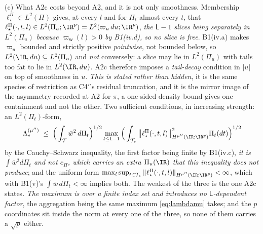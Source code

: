 \begin{remark}
\textup{(c)} What A2c costs beyond A2, and it is not only smoothness. Membership
$\ell^\Pi_\star\in L^{2}(\Pi)$ gives, at every $l$ and for $\Pi_t$-almost every $t$, that
$\ell^\Pi_\star(\cdot,t,l)\in L^{2}(\Pi_u;\IR^{p})=L^{2}(\varpi_u\,du;\IR^{p})$, \emph{the $\mathsf L-1$ slices
being separately in $L^{2}(\Pi_u)$ because $\varpi_{\mathsf w}(l)>0$ by B1(iv.d), so no slice is free}.
B1(iv.a) makes $\varpi_u$ bounded and
strictly positive \emph{pointwise}, not bounded below, so $L^{2}(\IR,du)\subseteq L^{2}(\Pi_u)$ and
\emph{not} conversely: a slice may lie in $L^{2}(\Pi_u)$ with tails too fat to lie in $L^{2}(\IR,du)$.
A2c therefore imposes a \emph{tail-decay} condition in $|u|$ on top of smoothness in $u$. \emph{This is
stated rather than hidden}, it is the same species of restriction as C4$'$'s residual truncation, and it
is the mirror image of the asymmetry recorded at A2 for $\pi$, a one-sided density bound gives one
containment and not the other. Two sufficient conditions, in increasing strength: an
$L^{2}(\Pi_t)$-form,
\[
\Lambda^{(\mu'')}_\star\;\le\;\Big(\int_{\mathcal T}\bar w^{2}\,d\Pi_t\Big)^{1/2}
\max_{l\le\mathsf L-1}
\Big(\int_{\mathcal T_\ast}\big\|\ell^\Pi_\star(\cdot,t,l)\big\|^{2}_{H^{\mu''}(\IR;\IR^{p})}\Pi_t(dt)\Big)^{1/2}
\]
by the Cauchy--Schwarz inequality, the first factor being finite by B1(iv.c), \emph{it is
$\int\bar w^{2}d\Pi_t$ and not $c_\Pi$, which carries an extra $\Pi_u(\IR)$ that this inequality does not
produce}; and the uniform form
$\max_{l}\sup_{t\in\mathcal T_\ast}\|\ell^\Pi_\star(\cdot,t,l)\|_{H^{\mu''}(\IR;\IR^{p})}<\infty$, which with B1(v)'s
$\int\bar w\,d\Pi_t<\infty$ implies both. The weakest of the three is the one A2c states.
\emph{The maximum is over a finite index set and introduces no $\mathsf L$-dependent factor}, the
aggregation being the same maximum \eqref{eq:lambdamu} takes; and the $p$ coordinates sit inside
the norm at every one of the three, so none of them carries a $\sqrt p$ either.


\end{remark}

